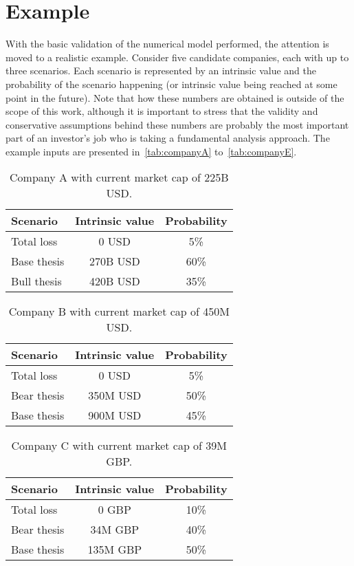 \documentclass{article}
\begin{document}
\section{Example}
\label{sec:example}

\noindent With the basic validation of the numerical model performed, the
attention is moved to a realistic example. Consider five candidate companies,
each with up to three scenarios. Each scenario is represented by an intrinsic
value and the probability of the scenario happening (or intrinsic value being
reached at some point in the future). Note that how these numbers are obtained
is outside of the scope of this work, although it is important to stress that
the validity and conservative assumptions behind these numbers are probably the
most important part of an investor's job who is taking a fundamental analysis
approach. The example inputs are presented in~\autoref{tab:companyA}
to~\autoref{tab:companyE}.

\begin{table}[!b]
\caption{Company A with current market cap of 225B USD.}
\vspace{0.25cm}
\centering
\begin{tabular}{l|c|c}
Scenario & Intrinsic value & Probability \\
\hline
Total loss & 0 USD & 5\% \\
Base thesis & 270B USD & 60\% \\
Bull thesis & 420B USD & 35\% \\
\end{tabular}%
\label{tab:companyA}%
\end{table}%

\begin{table}[!b]
\caption{Company B with current market cap of 450M USD.}
\vspace{0.25cm}
\centering
\begin{tabular}{l|c|c}
Scenario & Intrinsic value & Probability \\
\hline
Total loss& 0 USD & 5\% \\
Bear thesis & 350M USD & 50\% \\
Base thesis & 900M USD & 45\% \\
\end{tabular}%
\label{tab:companyB}%
\end{table}%

\begin{table}[!b]
\caption{Company C with current market cap of 39M GBP.}
\vspace{0.25cm}
\centering
\begin{tabular}{l|c|c}
Scenario & Intrinsic value & Probability \\
\hline
Total loss & 0 GBP & 10\% \\
Bear thesis & 34M GBP & 40\% \\
Base thesis & 135M GBP & 50\% \\
\end{tabular}%
\label{tab:companyC}%
\end{table}%
\end{document}
